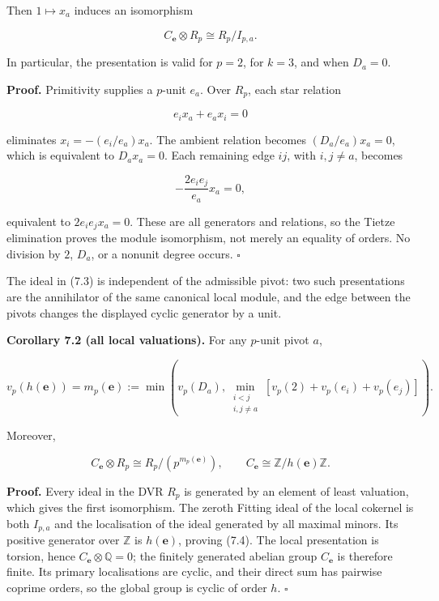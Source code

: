 \documentclass[
  11pt,
  a4paper,
]{article}
\begin{document}
Then \(1\mapsto x_a\) induces an isomorphism

\[
 \boxed{C_{\mathbf e}\otimes R_p\cong R_p/I_{p,a}.}
\tag{7.3}
\]

In particular, the presentation is valid for \(p=2\), for \(k=3\), and
when \(D_a=0\).

\textbf{Proof.} Primitivity supplies a \(p\)-unit \(e_a\). Over \(R_p\),
each star relation

\[
 e_ix_a+e_ax_i=0
\]

eliminates \(x_i=-(e_i/e_a)x_a\). The ambient relation becomes
\((D_a/e_a)x_a=0\), which is equivalent to \(D_ax_a=0\). Each remaining
edge \(ij\), with \(i,j\ne a\), becomes

\[
 -\frac{2e_ie_j}{e_a}x_a=0,
\]

equivalent to \(2e_ie_jx_a=0\). These are all generators and relations,
so the Tietze elimination proves the module isomorphism, not merely an
equality of orders. No division by \(2\), \(D_a\), or a nonunit degree
occurs. \(\square\)

The ideal in (7.3) is independent of the admissible pivot: two such
presentations are the annihilator of the same canonical local module,
and the edge between the pivots changes the displayed cyclic generator
by a unit.

\textbf{Corollary 7.2 (all local valuations).} For any \(p\)-unit pivot
\(a\),

\[
 \boxed{
 v_p(h(\mathbf e))=
 m_p(\mathbf e):=
 \min\left(
 v_p(D_a),
 \min_{\substack{i<j\\i,j\ne a}}
 [v_p(2)+v_p(e_i)+v_p(e_j)]
 \right).
 }
\tag{7.4}
\]

Moreover,

\[
 C_{\mathbf e}\otimes R_p\cong R_p/(p^{m_p(\mathbf e)}),
 \qquad
 C_{\mathbf e}\cong\mathbb Z/h(\mathbf e)\mathbb Z.
\tag{7.5}
\]

\textbf{Proof.} Every ideal in the DVR \(R_p\) is generated by an
element of least valuation, which gives the first isomorphism. The
zeroth Fitting ideal of the local cokernel is both \(I_{p,a}\) and the
localisation of the ideal generated by all maximal minors. Its positive
generator over \(\mathbb Z\) is \(h(\mathbf e)\), proving (7.4). The
local presentation is torsion, hence
\(C_{\mathbf e}\otimes\mathbb Q=0\); the finitely generated abelian
group \(C_{\mathbf e}\) is therefore finite. Its primary localisations
are cyclic, and their direct sum has pairwise coprime orders, so the
global group is cyclic of order \(h\). \(\square\)
\end{document}
